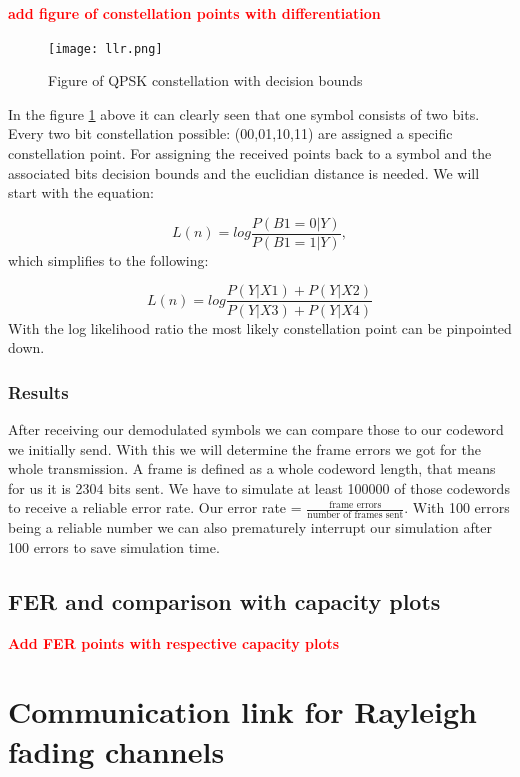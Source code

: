 \documentclass[12pt,oneside, draft]{report}
\newcommand\boldred[1]{\textcolor{red}{\textbf{#1}}}
\begin{document}
\boldred{add figure of constellation points with differentiation}

\begin{figure}[H]
	\centering
	\texttt{[image: llr.png]}
	\caption{Figure of QPSK constellation with decision bounds}
	\label{fig:llr}
\end{figure}

In the figure \ref{fig:llr} above it can clearly seen that one symbol consists of two bits. Every two bit constellation possible: (00,01,10,11) are assigned a specific constellation point. For assigning the received points back to a symbol and the associated bits decision bounds and the euclidian distance is needed. We will start with the equation:

\begin{equation}
\label{eq:llr}
L(n) = log\frac{P(B1=0|Y)}{P(B1=1|Y)},
\end{equation} 
which simplifies to the following:

\begin{equation}
L(n) = log\frac{P(Y|X1) + P(Y|X2)}{P(Y|X3) + P(Y|X4)}
\end{equation} 
With the log likelihood ratio the most likely constellation point can be pinpointed down.

\subsection{Results}

After receiving our demodulated symbols we can compare those to our codeword we initially send. With this we will determine the frame errors we got for the whole transmission. A frame is defined as a whole codeword length, that means for us it is 2304 bits sent. We have to simulate at least 100000 of those codewords to receive a reliable error rate. Our error rate = $\frac{\textrm{frame errors}}{\textrm{number of frames sent}}$. With 100 errors being a reliable number we can also prematurely interrupt our simulation after 100 errors to save simulation time.


\section{FER and comparison with capacity plots}

\boldred{Add FER points with respective capacity plots}


\chapter{Communication link for Rayleigh fading channels}
\end{document}
